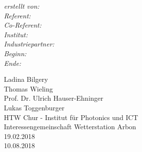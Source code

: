 \begin{titlepage}
\vspace{5cm}
\begin{minipage}[t]{0.3\textwidth}
	\begin{flushleft}
		\textit{erstellt von:} \\
		\vspace{10mm}
		\textit{Referent:} \\
		\textit{Co-Referent:} \\
		\vspace{2mm}
		\textit{Institut:}  \\
		\vspace{2mm}
		\textit{Industriepartner:} \\
		\vspace{2mm}
		\textit{Beginn:} \\
		\textit{Ende:}
	\end{flushleft}
\end{minipage}
\begin{minipage}[t]{0.7\textwidth}
	\begin{flushleft}
		Ladina Bilgery \\
		Thomas Wieling \\
		\vspace{5mm}
		Prof. Dr. Ulrich Hauser-Ehninger \\
		Lukas Toggenburger \\
		\vspace{2mm}
		HTW Chur - Institut für Photonics und ICT \\
		\vspace{2mm}
		Interessengemeinschaft Wetterstation Arbon \\
	\vspace{2mm}
		19.02.2018 \\
		10.08.2018
	\end{flushleft}
\end{minipage}


\thispagestyle{empty}%
\end{titlepage}

\restoregeometry %
